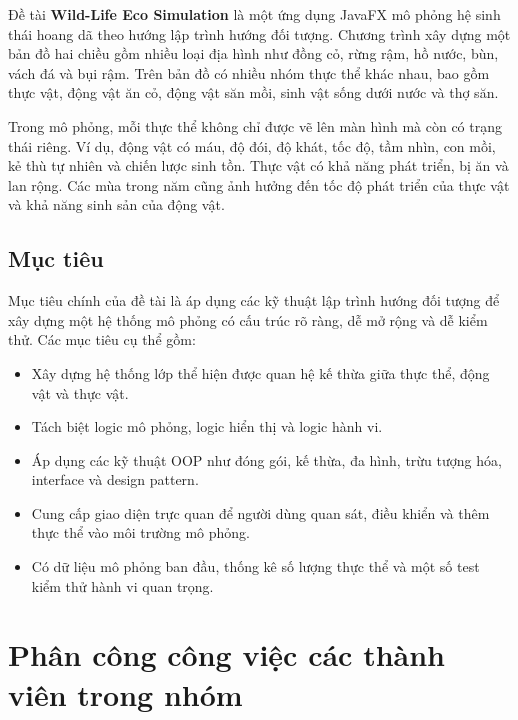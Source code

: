 \documentclass[12pt,a4paper]{article}
\begin{document}
Đề tài \textbf{Wild-Life Eco Simulation} là một ứng dụng JavaFX mô phỏng hệ sinh thái hoang dã theo hướng lập trình hướng đối tượng. Chương trình xây dựng một bản đồ hai chiều gồm nhiều loại địa hình như đồng cỏ, rừng rậm, hồ nước, bùn, vách đá và bụi rậm. Trên bản đồ có nhiều nhóm thực thể khác nhau, bao gồm thực vật, động vật ăn cỏ, động vật săn mồi, sinh vật sống dưới nước và thợ săn.

Trong mô phỏng, mỗi thực thể không chỉ được vẽ lên màn hình mà còn có trạng thái riêng. Ví dụ, động vật có máu, độ đói, độ khát, tốc độ, tầm nhìn, con mồi, kẻ thù tự nhiên và chiến lược sinh tồn. Thực vật có khả năng phát triển, bị ăn và lan rộng. Các mùa trong năm cũng ảnh hưởng đến tốc độ phát triển của thực vật và khả năng sinh sản của động vật.

\subsection{Mục tiêu}

Mục tiêu chính của đề tài là áp dụng các kỹ thuật lập trình hướng đối tượng để xây dựng một hệ thống mô phỏng có cấu trúc rõ ràng, dễ mở rộng và dễ kiểm thử. Các mục tiêu cụ thể gồm:

\begin{itemize}
    \item Xây dựng hệ thống lớp thể hiện được quan hệ kế thừa giữa thực thể, động vật và thực vật.
    \item Tách biệt logic mô phỏng, logic hiển thị và logic hành vi.
    \item Áp dụng các kỹ thuật OOP như đóng gói, kế thừa, đa hình, trừu tượng hóa, interface và design pattern.
    \item Cung cấp giao diện trực quan để người dùng quan sát, điều khiển và thêm thực thể vào môi trường mô phỏng.
    \item Có dữ liệu mô phỏng ban đầu, thống kê số lượng thực thể và một số test kiểm thử hành vi quan trọng.
\end{itemize}

\section{Phân công công việc các thành viên trong nhóm}
\end{document}

